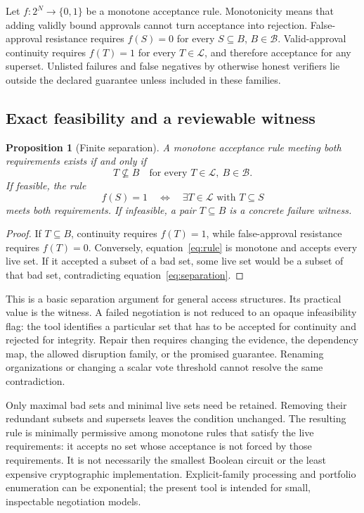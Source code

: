 \documentclass[11pt,letterpaper]{article}
\newtheorem{proposition}{Proposition}
\newcommand{\B}{\mathcal{B}}\newcommand{\Lset}{\mathcal{L}}
\begin{document}
Let $f:2^N\rightarrow\{0,1\}$ be a monotone acceptance rule. Monotonicity means that adding validly bound approvals cannot turn acceptance into rejection. False-approval resistance requires $f(S)=0$ for every $S\subseteq B$, $B\in\B$. Valid-approval continuity requires $f(T)=1$ for every $T\in\Lset$, and therefore acceptance for any superset. Unlisted failures and false negatives by otherwise honest verifiers lie outside the declared guarantee unless included in these families.

\subsection{Exact feasibility and a reviewable witness}
\begin{proposition}[Finite separation]
A monotone acceptance rule meeting both requirements exists if and only if
\begin{equation}\label{eq:separation}
 T\not\subseteq B\quad\text{for every }T\in\Lset,\ B\in\B.
\end{equation}
If feasible, the rule
\begin{equation}\label{eq:rule}
 f(S)=1\quad\Longleftrightarrow\quad\exists T\in\Lset\text{ with }T\subseteq S
\end{equation}
meets both requirements. If infeasible, a pair $T\subseteq B$ is a concrete failure witness.
\end{proposition}
\begin{proof}
If $T\subseteq B$, continuity requires $f(T)=1$, while false-approval resistance requires $f(T)=0$. Conversely, equation~\eqref{eq:rule} is monotone and accepts every live set. If it accepted a subset of a bad set, some live set would be a subset of that bad set, contradicting equation~\eqref{eq:separation}.
\end{proof}

This is a basic separation argument for general access structures. Its practical value is the witness. A failed negotiation is not reduced to an opaque infeasibility flag: the tool identifies a particular set that has to be accepted for continuity and rejected for integrity. Repair then requires changing the evidence, the dependency map, the allowed disruption family, or the promised guarantee. Renaming organizations or changing a scalar vote threshold cannot resolve the same contradiction.

Only maximal bad sets and minimal live sets need be retained. Removing their redundant subsets and supersets leaves the condition unchanged. The resulting rule is minimally permissive among monotone rules that satisfy the live requirements: it accepts no set whose acceptance is not forced by those requirements. It is not necessarily the smallest Boolean circuit or the least expensive cryptographic implementation. Explicit-family processing and portfolio enumeration can be exponential; the present tool is intended for small, inspectable negotiation models.
\end{document}
